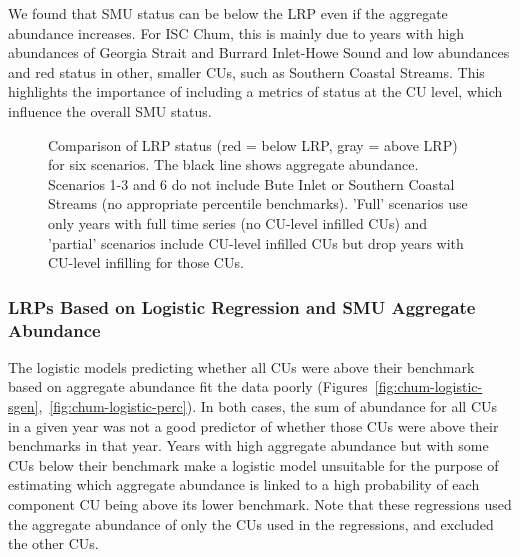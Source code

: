 \documentclass[11pt]{book}
\begin{document}
We found that SMU status can be below the LRP even if the aggregate abundance increases. For ISC Chum, this is mainly due to years with high abundances of Georgia Strait and Burrard Inlet-Howe Sound and low abundances and red status in other, smaller CUs, such as Southern Coastal Streams. This highlights the importance of including a metrics of status at the CU level, which influence the overall SMU status.
\begin{figure}[htb]

{\centering {} 

}

\caption{Comparison of LRP status (red = below LRP, gray = above LRP) for six scenarios. The black line shows aggregate abundance. Scenarios 1-3 and 6 do not include Bute Inlet or Southern Coastal Streams (no appropriate percentile benchmarks). 'Full' scenarios use only years with full time series (no CU-level infilled CUs) and 'partial' scenarios include CU-level infilled CUs but drop years with CU-level infilling for those CUs.}\label{fig:chum-LRP-compare}
\end{figure}
\hypertarget{lrps-based-on-logistic-regression-and-smu-aggregate-abundance}{%
\subsubsection{LRPs Based on Logistic Regression and SMU Aggregate Abundance}\label{lrps-based-on-logistic-regression-and-smu-aggregate-abundance}}

The logistic models predicting whether all CUs were above their benchmark based on aggregate abundance fit the data poorly (Figures~\ref{fig:chum-logistic-sgen},~\ref{fig:chum-logistic-perc}). In both cases, the sum of abundance for all CUs in a given year was not a good predictor of whether those CUs were above their benchmarks in that year. Years with high aggregate abundance but with some CUs below their benchmark make a logistic model unsuitable for the purpose of estimating which aggregate abundance is linked to a high probability of each component CU being above its lower benchmark. Note that these regressions used the aggregate abundance of only the CUs used in the regressions, and excluded the other CUs.
\end{document}
